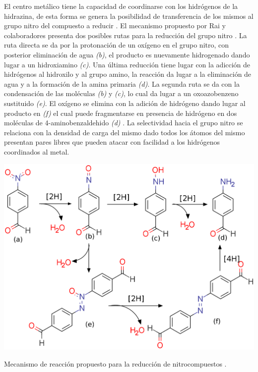 \documentclass[fleqn,10pt]{SelfArx}
\begin{document}
El centro met\'alico tiene la capacidad de coordinarse con los hidr\'ogenos de la hidrazina, de esta forma se genera la posibilidad de transferencia de los mismos al grupo nitro del compuesto a reducir \cite{mccleverty_meyer_2004}. El mecanismo propuesto por Rai y colaboradores presenta dos posibles rutas para la reducci\'on del grupo nitro \cite{rai_mahata_mukhopadhyay_gupta_li_nguyen_zhao_pathak_singh_2014}. La ruta directa se da por la protonaci\'on de un ox\'igeno en el grupo nitro, con posterior eliminaci\'on de agua \textit{(b)}, el producto es nuevamente hidrogenado dando lugar a un hidroxiamino \textit{(c)}. Una \'ultima reducci\'on tiene lugar con la adicci\'on de hidr\'ogenos al hidroxilo y al grupo amino, la reacci\'on da lugar a la eliminaci\'on de agua y a la formaci\'on de la amina primaria \textit{(d)}. La segunda ruta se da con la condensaci\'on de las mol\'eculas \textit{(b)} y \textit{(c)}, lo cual da lugar a un oxoazobenzeno sustituido \textit{(e)}. El ox\'igeno se elimina con la adici\'on de hidr\'ogeno dando lugar al producto en \textit{(f)} el cual puede fragmentarse en presencia de hidr\'ogeno en dos mol\'eculas de 4-aminobenzaldehido \textit{(d)} \cite{rai_mahata_mukhopadhyay_gupta_li_nguyen_zhao_pathak_singh_2014}. La selectividad hacia el grupo nitro se relaciona con la densidad de carga del mismo dado todos los \'atomos del mismo presentan pares libres que pueden atacar con facilidad a los hidr\'ogenos coordinados al metal.
\begin{scheme}[h]
	\centering
	\includegraphics[width = 0.8\linewidth]{Structures/mechanism.png}
	\label{sch: mechanism}
	\caption{Mecanismo de reacci\'on propuesto para la reducci\'on de nitrocompuestos \cite{rai_mahata_mukhopadhyay_gupta_li_nguyen_zhao_pathak_singh_2014}.}
\end{scheme}
\end{document}
